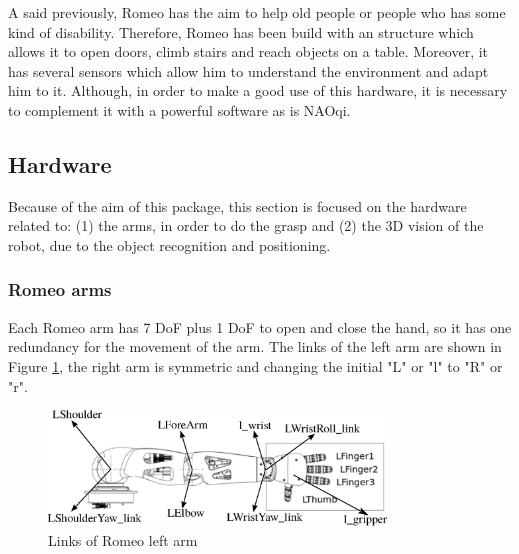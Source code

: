 \documentclass[12pt,a4paper,final,twoside,openright]{report}
\begin{document}
A said previously, Romeo has the aim to help old people or people who has some kind of disability. Therefore, Romeo has been build with an structure which allows it to open doors, climb stairs and reach objects on a table. Moreover, it has several sensors which allow him to understand the environment and adapt him to it. Although, in order to make a good use of this hardware, it is necessary to complement it with a powerful software as is NAOqi.


\subsection{Hardware}
\label{sec:romeo_hardware}

Because of the aim of this package, this section is focused on the hardware related to: (1) the arms, in order to do the grasp and (2) the 3D vision of the robot, due to the object recognition and positioning.

%

\subsubsection{Romeo arms}

Each Romeo arm has 7 DoF plus 1 DoF to open and close the hand, so it has one redundancy for the movement of the arm. The links of the left arm are shown in Figure \ref{fig:romeo_arm}, the right arm is symmetric and changing the initial "L" or "l" to "R" or "r".

\begin{figure}[h]
\centering
\includegraphics[width=0.8\textwidth]{images/arm_link.eps}
\caption{Links of Romeo left arm \cite{Aldebaran}\label{fig:romeo_arm}}
\end{figure}
\end{document}
